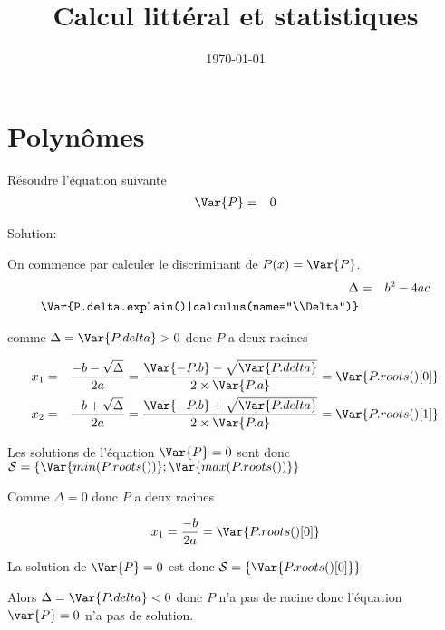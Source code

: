\documentclass[a4paper,10pt]{article}
\title{Calcul littéral et statistiques}
\date{\today}
\begin{document}
\maketitle


\section{Polynômes}



    Résoudre l'équation suivante
    \begin{eqnarray*}
        \Var{P} & = & 0
    \end{eqnarray*}

    Solution:

    On commence par calculer le discriminant de $P(x) = \Var{P}$.
    \begin{eqnarray*}
        \Delta & = & b^2-4ac \\
        \Var{P.delta.explain()|calculus(name="\\Delta")}
    \end{eqnarray*}

    comme $\Delta = \Var{P.delta} > 0$ donc $P$ a deux racines

    \begin{eqnarray*}
        x_1 & = & \frac{-b - \sqrt{\Delta}}{2a} =  \frac{\Var{-P.b} - \sqrt{\Var{P.delta}}}{2 \times \Var{P.a}} = \Var{P.roots()[0] } \\
        x_2 & = & \frac{-b + \sqrt{\Delta}}{2a} =  \frac{\Var{-P.b} + \sqrt{\Var{P.delta}}}{2 \times \Var{P.a}} = \Var{P.roots()[1] }
    \end{eqnarray*}

    Les solutions de l'équation $\Var{P} = 0$ sont donc $\mathcal{S} = \left\{ \Var{min(P.roots())}; \Var{max(P.roots())} \right\}$

    Comme $\Delta = 0$ donc $P$ a deux racines

    \begin{eqnarray*}
        x_1 = \frac{-b}{2a} = \Var{P.roots()[0]} \\
    \end{eqnarray*}

    La solution de $\Var{P} = 0$ est donc $\mathcal{S} = \left\{ \Var{P.roots()[0]}\right\}$

    Alors $\Delta = \Var{P.delta} < 0$ donc $P$ n'a pas de racine donc l'équation $\var{P} = 0$ n'a pas de solution.
\end{document}
